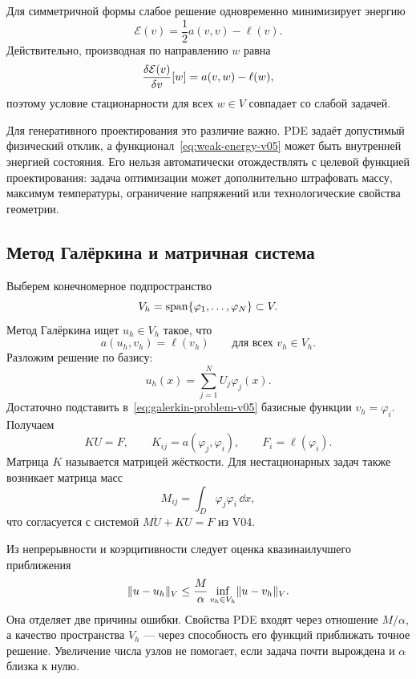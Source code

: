 Для симметричной формы слабое решение одновременно минимизирует энергию
\begin{equation}
\label{eq:weak-energy-v05}
 \mathcal E(v)
 =
 \frac12 a(v,v)-\ell(v).
\end{equation}
Действительно, производная по направлению $w$ равна
\[
 \frac{\delta \mathcal E(v)}{\delta v}[w]
 =a(v,w)-\ell(w),
\]
поэтому условие стационарности для всех $w\in V$ совпадает со слабой задачей.

Для генеративного проектирования это различие важно. PDE задаёт допустимый физический отклик, а функционал~\eqref{eq:weak-energy-v05} может быть внутренней энергией состояния. Его нельзя автоматически отождествлять с целевой функцией проектирования: задача оптимизации может дополнительно штрафовать массу, максимум температуры, ограничение напряжений или технологические свойства геометрии.

\subsection{Метод Галёркина и матричная система}

Выберем конечномерное подпространство
\[
 V_h=\operatorname{span}\{\varphi_1,\ldots,\varphi_N\}
 \subset V.
\]
Метод Галёркина ищет $u_h\in V_h$ такое, что
\begin{equation}
\label{eq:galerkin-problem-v05}
 a(u_h,v_h)=\ell(v_h)
 \qquad
 \text{для всех }v_h\in V_h.
\end{equation}
Разложим решение по базису:
\begin{equation}
\label{eq:galerkin-expansion-v05}
 u_h(x)=\sum_{j=1}^{N}U_j\varphi_j(x).
\end{equation}
Достаточно подставить в~\eqref{eq:galerkin-problem-v05} базисные функции $v_h=\varphi_i$. Получаем
\begin{equation}
\label{eq:fem-linear-system-v05}
 KU=F,
 \qquad
 K_{ij}=a(\varphi_j,\varphi_i),
 \qquad
 F_i=\ell(\varphi_i).
\end{equation}
Матрица $K$ называется матрицей жёсткости. Для нестационарных задач также возникает матрица масс
\begin{equation}
\label{eq:fem-mass-matrix-v05}
 M_{ij}=\int_D\varphi_j\varphi_i\,\dd x,
\end{equation}
что согласуется с системой $M\dot U+KU=F$ из V04.

Из непрерывности и коэрцитивности следует оценка квазинаилучшего приближения
\begin{equation}
\label{eq:cea-estimate-v05}
 \lVert u-u_h\rVert_V
 \leq
 \frac{M}{\alpha}
 \inf_{v_h\in V_h}\lVert u-v_h\rVert_V.
\end{equation}
Она отделяет две причины ошибки. Свойства PDE входят через отношение $M/\alpha$, а качество пространства $V_h$ --- через способность его функций приближать точное решение. Увеличение числа узлов не помогает, если задача почти вырождена и $\alpha$ близка к нулю.

